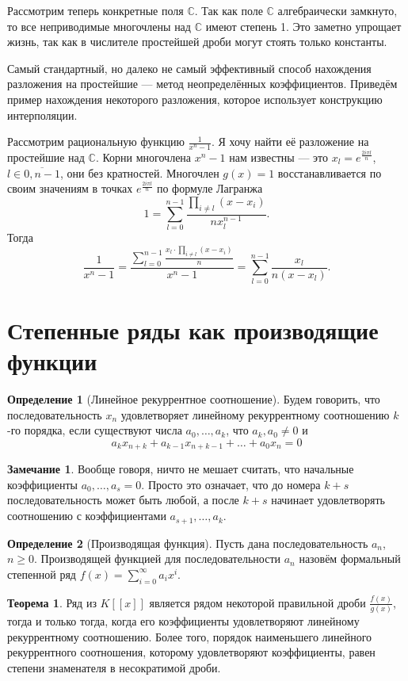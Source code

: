 \documentclass[10pt,a4paper,oneside]{book}
\theoremstyle{definition}
\newtheorem*{rem}{Замечание}
\newtheorem*{defn}{Определение}
\newtheorem{thm}{Теорема}
\newcommand{\mb}[1]{\mathbb{#1}}
\newcommand{\ovl}{\overline}
\def\thrm{\begin{thm}}
\def\ethrm{\end{thm}}
\def\dfn{\begin{defn}}
\def\edfn{\end{defn}}
\def\rm{\begin{rem}}
\def\erm{\end{rem}}
\begin{document}
Рассмотрим теперь конкретные поля $\mb C$. Так как поле $\mb C$ алгебраически замкнуто, то все неприводимые многочлены над $\mb C$ имеют степень 1. Это заметно упрощает жизнь, так как в числителе простейшей дроби могут стоять только константы.

Самый стандартный, но далеко не самый эффективный способ нахождения разложения на простейшие --- метод неопределённых коэффициентов. Приведём пример нахождения некоторого разложения, которое использует конструкцию интерполяции.

Рассмотрим рациональную функцию $\frac{1}{x^{n}-1}$. Я хочу найти её разложение на простейшие над $\mb C$. Корни  многочлена $x^{n}-1$ нам известны --- это $x_l=e^{\tfrac{2i \pi l}{n}}$, $l\in \ovl{0,n-1}$, они без кратностей. Многочлен $g(x)=1$ восстанавливается по своим значениям в точках  $e^{\tfrac{2i \pi l}{n}}$ по формуле Лагранжа
$$1=\sum_{l=0}^{n-1} \frac{ \prod_{i\neq l} (x-x_i)}{nx_l^{n-1}}.$$
Тогда
$$\frac{1}{x^{n}-1}=\frac{\sum_{l=0}^{n-1} \frac{ x_l\cdot \prod_{i\neq l} (x-x_i)}{n}}{x^{n}-1}= \sum_{l=0}^{n-1} \frac{x_l}{n(x-x_l)}.$$



\section{Степенные ряды как производящие функции}


\dfn[Линейное рекуррентное соотношение] Будем говорить, что последовательность $x_n$ удовлетворяет линейному рекуррентному соотношению $k$-го порядка, если существуют числа $a_0,\dots,a_{k}$, что $a_k,a_0\neq 0$ и
$$a_k x_{n+k}+a_{k-1}x_{n+k-1}+\dots+a_0x_n=0$$
\edfn


\rm Вообще говоря, ничто не мешает считать, что начальные коэффициенты $a_0,\dots,a_s=0$. Просто это означает, что до номера $k+s$ последовательность может быть любой, а после $k+s$ начинает удовлетворять соотношению с коэффициентами $a_{s+1},\dots,a_k$.
\erm

\dfn[Производящая функция] Пусть дана последовательность $a_n$, $n\geq 0$. Производящей функцией для последовательности $a_n$ назовём формальный степенной ряд $f(x)=\sum_{i=0}^{\infty} a_ix^i$.
\edfn



\thrm Ряд из $K[[x]]$ является рядом некоторой правильной дроби $\frac{f(x)}{g(x)}$, тогда и только тогда, когда его коэффициенты  удовлетворяют линейному рекуррентному соотношению. Более того, порядок наименьшего линейного рекуррентного соотношения, которому удовлетворяют коэффициенты, равен степени знаменателя в несократимой дроби.
\ethrm
\end{document}

